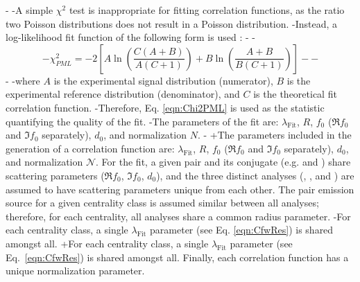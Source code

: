 \begin{table}[htbp]
\begin{table}[htbp]
-
-A simple $\chi^{2}$ test is inappropriate for fitting correlation functions, as the ratio two Poisson distributions does not result in a Poisson distribution.
-Instead, a log-likelihood fit function of the following form is used \cite{Lisa:2005dd}:
-
-\begin{equation}
- \chi^{2}_{PML} = -2\left[A\ln\left(\frac{C(A+B)}{A(C+1)}\right) + B\ln\left(\frac{A+B}{B(C+1)}\right)\right]
-\label{eqn:Chi2PML}
-\end{equation}
-
-where $A$ is the experimental signal distribution (numerator), $B$ is the experimental reference distribution (denominator), and $C$ is the theoretical fit correlation function.
-Therefore, Eq. \ref{eqn:Chi2PML} is used as the statistic quantifying the quality of the fit.
-The parameters of the fit are: $\lambda_{\mathrm{Fit}}$, $R$, $f_{0}$ ($\Re f_{0}$ and $\Im f_{0}$ separately), $d_{0}$, and normalization $N$.
-
+The parameters included in the generation of a correlation function are: $\lambda_{\mathrm{Fit}}$, $R$, $f_{0}$ ($\Re f_{0}$ and $\Im f_{0}$ separately), $d_{0}$, and normalization $\mathcal{N}$.
 For the fit, a given pair and its conjugate (e.g. \LamKchP and \ALamKchM) share scattering parameters ($\Re f_{0}$, $\Im f_{0}$, $d_{0}$), and the three distinct analyses (\LamKchP, \LamKchM, and \LamKs) are assumed to have scattering parameters unique from each other.
 The pair emission source for a given centrality class is assumed similar between all analyses; therefore, for each centrality, all \LamK analyses share a common radius parameter.
-For each centrality class, a single $\lambda_{\mathrm{Fit}}$ parameter (see Eq. \ref{eqn:CfwRes}) is shared amongst all.
+For each centrality class, a single $\lambda_{\mathrm{Fit}}$ parameter (see Eq.\ \ref{eqn:CfwRes}) is shared amongst all.
 Finally, each correlation function has a unique normalization parameter.
 

\end{table}
\end{table}
